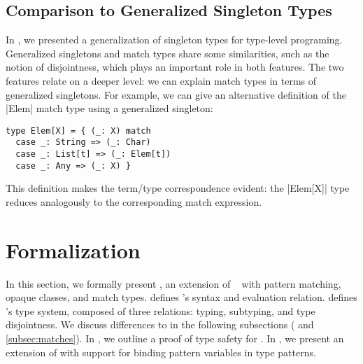 \subsection{Comparison to Generalized Singleton Types}

In , we presented a generalization of singleton types for type-level programing.
Generalized singletons and match types share some similarities, such as the notion of disjointness, which plays an important role in both features.
The two features relate on a deeper level: we can explain match types in terms of generalized singletons.
For example, we can give an alternative definition of the |Elem| match type using a generalized singleton:
%
\begin{lstlisting}
type Elem[X] = { (_: X) match
  case _: String => (_: Char)
  case _: List[t] => (_: Elem[t])
  case _: Any => (_: X) }
\end{lstlisting}
%
This definition makes the term/type correspondence evident: the |Elem[X]| type reduces analogously to the corresponding match expression.



\section{Formalization}
\label{sec:formalization}

In this section, we formally present \SystemFm, an extension of \SystemFsub~\citep{cardelli1994an} with pattern matching, opaque classes, and match types.
 defines \Fm's syntax and evaluation relation.  defines \Fm's type system, composed of three relations: typing, subtyping, and type disjointness.
We discuss differences to \SystemFsub in the following subsections ( and \ref{subsec:matches}).
In , we outline a proof of type safety for \SystemFm.
In , we present an extension of \SystemFm with support for binding pattern variables in type patterns.

